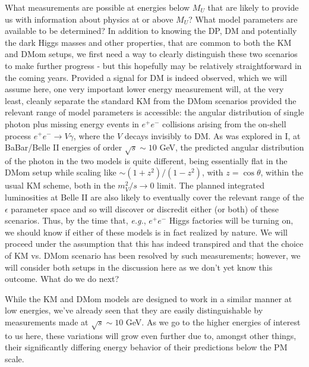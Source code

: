 \documentclass[14pt]{article}
\def\eg{{\it e.g.}}
\def\to{\rightarrow}
\begin{document}
{What measurements are possible at energies below $M_U$ that are likely to provide us with information about physics at or above $M_U$? What model parameters are available to be determined? 
In addition to knowing the DP, DM and potentially the dark Higgs masses and other properties\cite{Foguel:2022unm}, that are common to both the KM and DMom setups, we first need a way to 
clearly distinguish these two scenarios to make further progress - but this hopefully may be relatively straightforward in the coming years. Provided a signal for DM is indeed observed, which we will  
assume here, one very important lower energy measurement will, at the very least, cleanly separate the standard KM from the DMom scenarios provided the relevant range of model parameters 
is accessible: the angular distribution of single photon plus missing energy events in $e^+e^-$ collisions arising from the on-shell process $e^+e^- \to V\gamma$, where the $V$ decays invisibly to DM. 
As was explored in I, at BaBar/Belle II energies of order $\sqrt s \sim 10$ GeV, the predicted angular distribution of the photon in the two models is quite different, being essentially flat in the DMom setup 
while scaling like $\sim (1+z^2)/(1-z^2)$, with $z=\cos \theta$, within the usual KM scheme, both in the $m_V^2/s \to 0$ limit. The planned integrated luminosities at Belle II are also likely to eventually 
cover the relevant range of the $\epsilon$ parameter space\cite{Belle-II:2018jsg,Belle-II:2022jyy} and so will discover or discredit either (or both) of these scenarios. Thus, by the time 
that, \eg, $e^+e^-$ Higgs factories will be turning on, we should know if either of these models is in fact realized by nature. We will proceed under the assumption that this has indeed transpired and 
that the choice of KM vs. DMom scenario has been resolved by such measurements; however, we will consider both setups in the discussion here as we don't yet know this outcome. What do we do next?

While the KM and DMom models are designed to work in a similar manner at low energies, we've already seen that they are easily distinguishable by measurements made at $\sqrt s \sim 10$ GeV. 
As we go to the higher energies of interest to us here, these variations will grow even further due to, amongst other things, their significantly differing energy behavior of their predictions below the 
PM scale.

}
\end{document}
